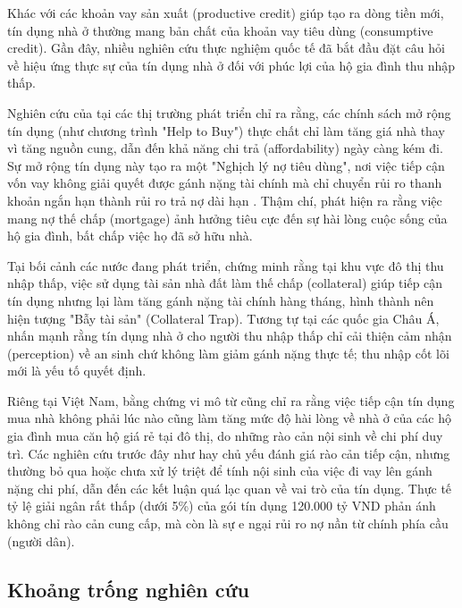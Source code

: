 \documentclass[12pt,a4paper]{report}
\begin{document}
Khác với các khoản vay sản xuất (productive credit) giúp tạo ra dòng tiền mới, tín dụng nhà ở thường mang bản chất của khoản vay tiêu dùng (consumptive credit). Gần đây, nhiều nghiên cứu thực nghiệm quốc tế đã bắt đầu đặt câu hỏi về hiệu ứng thực sự của tín dụng nhà ở đối với phúc lợi của hộ gia đình thu nhập thấp. 

Nghiên cứu của \textcite{Carozzi2024} tại các thị trường phát triển chỉ ra rằng, các chính sách mở rộng tín dụng (như chương trình "Help to Buy") thực chất chỉ làm tăng giá nhà thay vì tăng nguồn cung, dẫn đến khả năng chi trả (affordability) ngày càng kém đi. Sự mở rộng tín dụng này tạo ra một "Nghịch lý nợ tiêu dùng", nơi việc tiếp cận vốn vay không giải quyết được gánh nặng tài chính mà chỉ chuyển rủi ro thanh khoản ngắn hạn thành rủi ro trả nợ dài hạn \parencite{Larson2025, Brown2013}. Thậm chí, \textcite{Will2025} phát hiện ra rằng việc mang nợ thế chấp (mortgage) ảnh hưởng tiêu cực đến sự hài lòng cuộc sống của hộ gia đình, bất chấp việc họ đã sở hữu nhà.

Tại bối cảnh các nước đang phát triển, \textcite{Edwin2023} chứng minh rằng tại khu vực đô thị thu nhập thấp, việc sử dụng tài sản nhà đất làm thế chấp (collateral) giúp tiếp cận tín dụng nhưng lại làm tăng gánh nặng tài chính hàng tháng, hình thành nên hiện tượng "Bẫy tài sản" (Collateral Trap). Tương tự tại các quốc gia Châu Á, \textcite{Syed2025} nhấn mạnh rằng tín dụng nhà ở cho người thu nhập thấp chỉ cải thiện cảm nhận (perception) về an sinh chứ không làm giảm gánh nặng thực tế; thu nhập cốt lõi mới là yếu tố quyết định. 

Riêng tại Việt Nam, bằng chứng vi mô từ \textcite{Nguyen2016} cũng chỉ ra rằng việc tiếp cận tín dụng mua nhà không phải lúc nào cũng làm tăng mức độ hài lòng về nhà ở của các hộ gia đình mua căn hộ giá rẻ tại đô thị, do những rào cản nội sinh về chi phí duy trì. Các nghiên cứu trước đây như \textcite{UEH2023} hay \textcite{Nguyen2024} chủ yếu đánh giá rào cản tiếp cận, nhưng thường bỏ qua hoặc chưa xử lý triệt để tính nội sinh của việc đi vay lên gánh nặng chi phí, dẫn đến các kết luận quá lạc quan về vai trò của tín dụng. Thực tế tỷ lệ giải ngân rất thấp (dưới 5\%) của gói tín dụng 120.000 tỷ VND \parencite{SBV2025} phản ánh không chỉ rào cản cung cấp, mà còn là sự e ngại rủi ro nợ nần từ chính phía cầu (người dân).

\subsection{Khoảng trống nghiên cứu}
\end{document}
